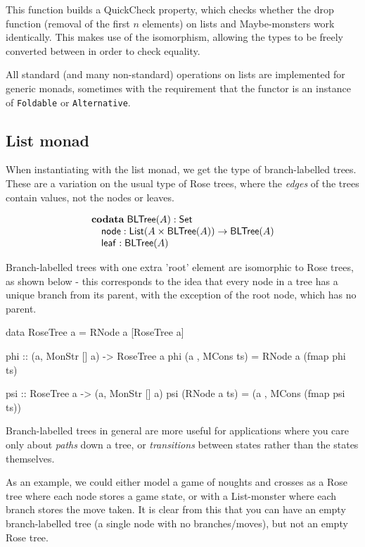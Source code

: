 \documentclass{article}
\begin{document}
This function builds a QuickCheck property, which checks whether the drop function (removal of the first $n$ elements) on lists and Maybe-monsters work identically. This makes use of the isomorphism, allowing the types to be freely converted between in order to check equality. 

All standard (and many non-standard) operations on lists are implemented for generic monads, sometimes with the requirement that the functor is an instance of \verb+Foldable+ or \verb+Alternative+.

\subsection{List monad}

When instantiating with the list monad, we get the type of branch-labelled trees. These are a variation on the usual type of Rose trees, where the \emph{edges} of the trees contain values, not the nodes or leaves.

$$
\begin{array}[t]{l}
\mathbf{codata}\;
\mathsf{BLTree}(A):\mathsf{Set}\\
\quad \mathsf{node} : \mathsf{List}(A \times \mathsf{BLTree}(A)) \rightarrow \mathsf{BLTree}(A)\\
\quad \mathsf{leaf} : \mathsf{BLTree}(A)
\end{array}
$$

Branch-labelled trees with one extra 'root' element are isomorphic to Rose trees, as shown below - this corresponds to the idea that every node in a tree has a unique branch from its parent, with the exception of the root node, which has no parent.

\begin{haskell}
data RoseTree a = RNode a [RoseTree a]

phi :: (a, MonStr [] a) -> RoseTree a
phi (a , MCons ts) = RNode a (fmap phi ts)

psi :: RoseTree a -> (a, MonStr [] a)
psi (RNode a ts) = (a , MCons (fmap psi ts))
\end{haskell}

Branch-labelled trees in general are more useful for applications where you care only about \emph{paths} down a tree, or \emph{transitions} between states rather than the states themselves. 

As an example, we could either model a game of noughts and crosses as a Rose tree where each node stores a game state, or with a List-monster where each branch stores the move taken. It is clear from this that you can have an empty branch-labelled tree (a single node with no branches/moves), but not an empty Rose tree.
\end{document}

